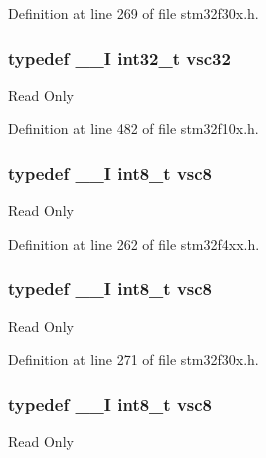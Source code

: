 Definition at line 269 of file stm32f30x.\-h.

\hypertarget{group___exported__types_gaec1d22666cf030b79051e5daa372fbc8}{
\subsubsection[{vsc32}]{\setlength{\rightskip}{0pt plus 5cm}typedef \-\_\-\-\_\-\-I {\bf int32\-\_\-t} {\bf vsc32}}}\label{group___exported__types_gaec1d22666cf030b79051e5daa372fbc8}
Read Only 

Definition at line 482 of file stm32f10x.\-h.

\hypertarget{group___exported__types_ga47463bcded079ac61d5da46aff497803}{
\subsubsection[{vsc8}]{\setlength{\rightskip}{0pt plus 5cm}typedef \-\_\-\-\_\-\-I {\bf int8\-\_\-t} {\bf vsc8}}}\label{group___exported__types_ga47463bcded079ac61d5da46aff497803}
Read Only 

Definition at line 262 of file stm32f4xx.\-h.

\hypertarget{group___exported__types_ga47463bcded079ac61d5da46aff497803}{
\subsubsection[{vsc8}]{\setlength{\rightskip}{0pt plus 5cm}typedef \-\_\-\-\_\-\-I {\bf int8\-\_\-t} {\bf vsc8}}}\label{group___exported__types_ga47463bcded079ac61d5da46aff497803}
Read Only 

Definition at line 271 of file stm32f30x.\-h.

\hypertarget{group___exported__types_ga47463bcded079ac61d5da46aff497803}{
\subsubsection[{vsc8}]{\setlength{\rightskip}{0pt plus 5cm}typedef \-\_\-\-\_\-\-I {\bf int8\-\_\-t} {\bf vsc8}}}\label{group___exported__types_ga47463bcded079ac61d5da46aff497803}
Read Only 

